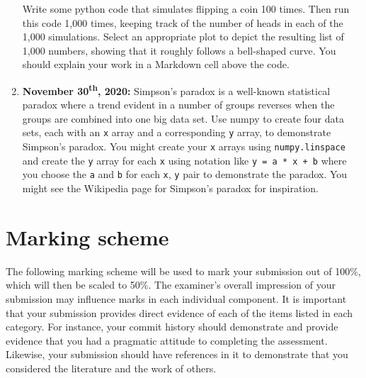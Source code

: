 \documentclass[a4paper, 12pt]{scrartcl}
\begin{document}
\begin{enumerate}
        Write some python code that simulates flipping a coin 100 times.
        Then run this code 1,000 times, keeping track of the number of heads in each of the 1,000 simulations.
        Select an appropriate plot to depict the resulting list of 1,000 numbers, showing that it roughly follows a bell-shaped curve.
        You should explain your work in a Markdown cell above the code.
      \item \textbf{November 30\textsuperscript{th}, 2020:}
        Simpson's paradox is a well-known statistical paradox where a trend evident in a number of groups reverses when the groups are combined into one big data set.
        Use numpy to create four data sets, each with an \texttt{x} array and a corresponding \texttt{y} array, to demonstrate Simpson's paradox.
        You might create your \texttt{x} arrays using \texttt{numpy.linspace} and create the \texttt{y} array for each \texttt{x} using notation like \texttt{y = a * x + b} where you choose the \texttt{a} and \texttt{b} for each \texttt{x}, \texttt{y} pair to demonstrate the paradox.
        You might see the Wikipedia page for Simpson's paradox for inspiration.

      \end{enumerate}


  \newpage

  \section*{Marking scheme}
    The following marking scheme will be used to mark your submission out of 100\%, which will then be scaled to 50\%.
    The examiner's overall impression of your submission may influence marks in each individual component.
    It is important that your submission provides direct evidence of each of the items listed in each category.
    For instance, your commit history should demonstrate and provide evidence that you had a pragmatic attitude to completing the assessment.
    Likewise, your submission should have references in it to demonstrate that you considered the literature and the work of others.
\end{document}
